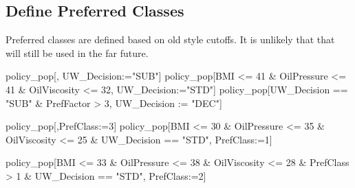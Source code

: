\documentclass[
  letterpaper,
  DIV=11,
  numbers=noendperiod]{scrartcl}
\newenvironment{Shaded}{\begin{snugshade}}{\end{snugshade}}
\newcommand{\DecValTok}[1]{\textcolor[rgb]{0.68,0.00,0.00}{#1}}
\newcommand{\ErrorTok}[1]{\textcolor[rgb]{0.68,0.00,0.00}{#1}}
\newcommand{\NormalTok}[1]{\textcolor[rgb]{0.00,0.23,0.31}{#1}}
\newcommand{\SpecialCharTok}[1]{\textcolor[rgb]{0.37,0.37,0.37}{#1}}
\newcommand{\StringTok}[1]{\textcolor[rgb]{0.13,0.47,0.30}{#1}}
\begin{document}
\hypertarget{define-preferred-classes}{%
\subsection{Define Preferred Classes}\label{define-preferred-classes}}

Preferred classes are defined based on old style cutoffs. It is unlikely
that that will still be used in the far future.

\begin{Shaded}
\begin{Highlighting}[]
\NormalTok{policy\_pop[,}
\NormalTok{           UW\_Decision}\SpecialCharTok{:}\ErrorTok{=}\StringTok{"SUB"}\NormalTok{]}
\NormalTok{policy\_pop[BMI }\SpecialCharTok{\textless{}=} \DecValTok{41} \SpecialCharTok{\&}\NormalTok{ OilPressure }\SpecialCharTok{\textless{}=} \DecValTok{41} \SpecialCharTok{\&}\NormalTok{ OilViscosity }\SpecialCharTok{\textless{}=} \DecValTok{32}\NormalTok{,}
\NormalTok{           UW\_Decision}\SpecialCharTok{:}\ErrorTok{=}\StringTok{"STD"}\NormalTok{]}
\NormalTok{policy\_pop[UW\_Decision }\SpecialCharTok{==} \StringTok{"SUB"} \SpecialCharTok{\&}\NormalTok{ PrefFactor }\SpecialCharTok{\textgreater{}} \DecValTok{3}\NormalTok{, }
\NormalTok{           UW\_Decision }\SpecialCharTok{:}\ErrorTok{=} \StringTok{"DEC"}\NormalTok{]}

\NormalTok{policy\_pop[,PrefClass}\SpecialCharTok{:}\ErrorTok{=}\DecValTok{3}\NormalTok{]}
\NormalTok{policy\_pop[BMI }\SpecialCharTok{\textless{}=} \DecValTok{30} \SpecialCharTok{\&}\NormalTok{ OilPressure }\SpecialCharTok{\textless{}=} \DecValTok{35} \SpecialCharTok{\&}\NormalTok{ OilViscosity }\SpecialCharTok{\textless{}=} \DecValTok{25} \SpecialCharTok{\&} 
\NormalTok{             UW\_Decision }\SpecialCharTok{==} \StringTok{"STD"}\NormalTok{,}
\NormalTok{           PrefClass}\SpecialCharTok{:}\ErrorTok{=}\DecValTok{1}\NormalTok{]}

\NormalTok{policy\_pop[BMI }\SpecialCharTok{\textless{}=} \DecValTok{33} \SpecialCharTok{\&}\NormalTok{ OilPressure }\SpecialCharTok{\textless{}=} \DecValTok{38} \SpecialCharTok{\&}\NormalTok{ OilViscosity }\SpecialCharTok{\textless{}=} \DecValTok{28} \SpecialCharTok{\&}\NormalTok{ PrefClass }\SpecialCharTok{\textgreater{}} \DecValTok{1} \SpecialCharTok{\&} 
\NormalTok{             UW\_Decision }\SpecialCharTok{==} \StringTok{"STD"}\NormalTok{,}
\NormalTok{           PrefClass}\SpecialCharTok{:}\ErrorTok{=}\DecValTok{2}\NormalTok{]}
\end{Highlighting}
\end{Shaded}
\end{document}
